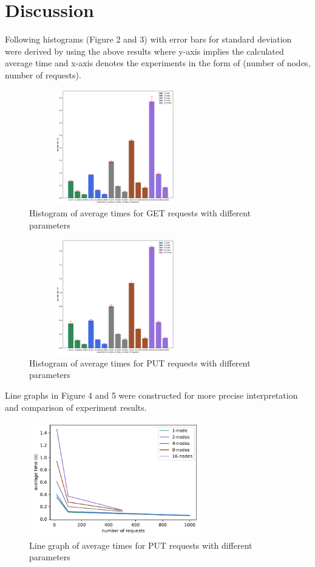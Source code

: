 \documentclass[
    a4paper,
    twocolumn,
]{article}
\begin{document}
\section{Discussion}

Following histograms (Figure 2 and 3) with error bars for standard deviation~\cite{2} were derived by using the above results where y-axis implies the calculated average time and x-axis denotes the experiments in the form of (number of nodes, number of requests).\\

\setlength{\intextsep}{10pt plus 2pt minus 0pt}
\begin{figure}[!ht]
	\centering
	\includegraphics[width=7.5cm, height=5cm]{get.pdf}
	\caption{Histogram of average times for GET requests with different parameters}
\end{figure}

\setlength{\intextsep}{5pt plus 2pt minus 0pt}
\begin{figure}[!ht]
	\centering
	\includegraphics[width=7.5cm, height=5cm]{put.pdf}
	\caption{Histogram of average times for PUT requests with different parameters}
\end{figure}

Line graphs in Figure 4 and 5 were constructed for more precise interpretation and comparison of experiment results.\\

\setlength{\intextsep}{7pt plus 2pt minus 0pt}
\begin{figure}[!ht]
	\centering
	\includegraphics[width=7.5cm, height=5cm]{put_line.pdf}
	\caption{Line graph of average times for PUT requests with different parameters}
\end{figure}
\end{document}
